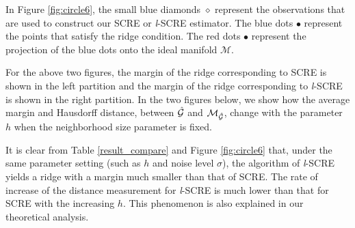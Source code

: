 \documentclass[aos,preprint]{imsart}
\theoremstyle{remark}
\begin{document}
In Figure \ref{fig:circle6}, the small blue diamonds $\diamond$ represent the observations that are used to construct our SCRE or {\it l}-SCRE estimator. The blue dots $\bullet$ represent the points that satisfy the ridge condition. The red dots $\bullet$ represent the projection of the blue dots onto the ideal manifold ${\mathcal M}$.

For the above two figures, the margin of the ridge corresponding to SCRE is shown in the left partition and the margin of the ridge corresponding to {\it l}-SCRE is shown in the right partition.
In the two figures below, we show how the average margin and Hausdorff distance, between $\cal \hat{G}$ and ${\cal M}_{\cal \hat{G}}$, change with the parameter $h$ when the neighborhood size parameter is fixed.


It is clear from Table \ref{result_compare} and Figure \ref{fig:circle6} that, under the same parameter setting (such as $h$ and noise level $\sigma$), the algorithm of {\it l}-SCRE yields a ridge with a margin much smaller than that of SCRE. The rate of increase of the distance measurement for {\it l}-SCRE is much lower than that for SCRE with the increasing $h$. This phenomenon is also explained in our theoretical analysis.
\end{document}

